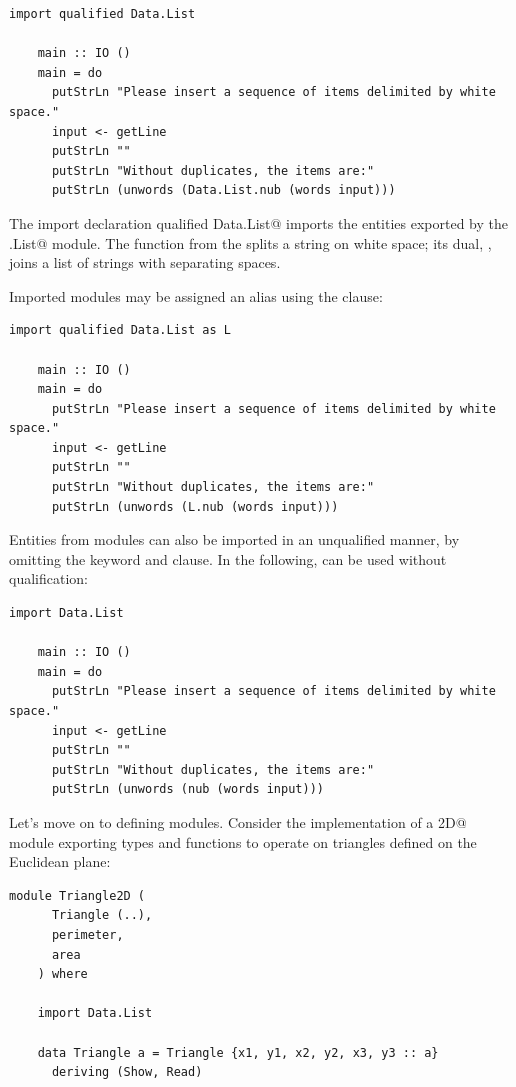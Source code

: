 \documentclass[UdineBachThesis,american,11pt]{PhdThesis}
\begin{document}
  \pagebreak

  \begin{lstlisting}[gobble=4,basicstyle=\ttfamily\small]
    import qualified Data.List

    main :: IO ()
    main = do
      putStrLn "Please insert a sequence of items delimited by white space."
      input <- getLine
      putStrLn ""
      putStrLn "Without duplicates, the items are:"
      putStrLn (unwords (Data.List.nub (words input)))
  \end{lstlisting}

  The import declaration \lstinline@import qualified Data.List@ imports the
  entities exported by the \lstinline@Data.List@ module. The function
  \lstinline@words@ from the \lstinline@Prelude@ splits a string on white space;
  its dual, \lstinline@unwords@, joins a list of strings with separating spaces.

  Imported modules may be assigned an alias using the \lstinline@as@ clause:

  \begin{lstlisting}[gobble=4,basicstyle=\ttfamily\small]
    import qualified Data.List as L

    main :: IO ()
    main = do
      putStrLn "Please insert a sequence of items delimited by white space."
      input <- getLine
      putStrLn ""
      putStrLn "Without duplicates, the items are:"
      putStrLn (unwords (L.nub (words input)))
  \end{lstlisting}

  Entities from modules can also be imported in an unqualified manner, by
  omitting the \lstinline@qualified@ keyword and \lstinline@as@ clause. In the
  following, \lstinline@nub@ can be used without qualification:

  \begin{lstlisting}[gobble=4,basicstyle=\ttfamily\small]
    import Data.List

    main :: IO ()
    main = do
      putStrLn "Please insert a sequence of items delimited by white space."
      input <- getLine
      putStrLn ""
      putStrLn "Without duplicates, the items are:"
      putStrLn (unwords (nub (words input)))
  \end{lstlisting}

  Let's move on to defining modules. Consider the implementation of a
  \lstinline@Triangle2D@ module exporting types and functions to operate on
  triangles defined on the Euclidean plane:

  \begin{lstlisting}[gobble=4,basicstyle=\ttfamily\small]
    module Triangle2D (
      Triangle (..),
      perimeter,
      area
    ) where

    import Data.List

    data Triangle a = Triangle {x1, y1, x2, y2, x3, y3 :: a}
      deriving (Show, Read)
  \end{lstlisting}
\end{document}
